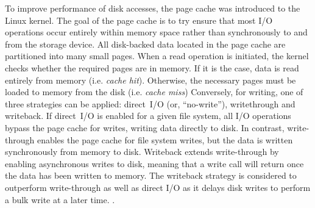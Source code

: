\documentclass[conference]{IEEEtran}
\begin{document}
        To improve performance of disk accesses, the page cache was introduced to the Linux kernel. %
            The goal of the page cache is to try ensure that most I/O operations occur entirely
            within memory space rather than synchronously to and from the storage device.
            All disk-backed data located in the page cache are partitioned into many small pages.
            When a read operation is initiated, the kernel checks whether the required pages are in memory.
            If it is the case, data is read entirely from memory (i.e. \textit{cache hit}). Otherwise,
            the necessary pages must be loaded to memory from the disk (i.e. \textit{cache miss})
            Conversely, for writing, one of three strategies can be applied: direct~I/O (or, ``no-write''),
            writethrough and writeback.
            If direct~I/O is enabled for a given file system, all I/O operations bypass the
            page cache for writes, writing data directly to disk. In contrast, write-through enables the page cache
            for file system writes, but the data is written synchronously from memory to disk. Writeback extends write-through
            by enabling asynchronous writes to disk, meaning that a write call will return once
            the data has been written to memory.
            The writeback strategy is considered to outperform write-through as well as 
            direct I/O as it delays disk writes to perform a bulk write at a later time.
            \cite{linuxdev3rd2010}. 
            
\end{document}
